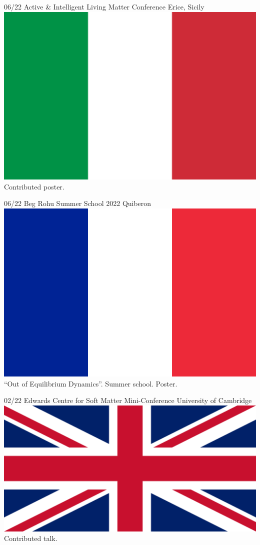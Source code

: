 \documentclass[letterpaper]{cvtemplate_en} %
\begin{document}
\begin{cvbody}
\cvitem
	{06/22}
	{}
	{Active \& Intelligent Living Matter Conference}
	{Erice, Sicily \includegraphics[height=0.8\myheight]{it}}
	{}{}{}
	{}
	{Contributed poster.\\}

\cvitem
	{06/22}
	{}
	{Beg Rohu Summer School 2022}
	{Quiberon \includegraphics[height=0.8\myheight]{fr}}
	{}{}{}
	{}
	{``Out of Equilibrium Dynamics''. Summer school. Poster.\\}

\cvitem
	{02/22}
	{}
	{Edwards Centre for Soft Matter Mini-Conference}
	{University of Cambridge \includegraphics[height=0.8\myheight]{uk}}
	{}{}{}
	{}
	{Contributed talk.\\}


\end{cvbody}
\end{document}
